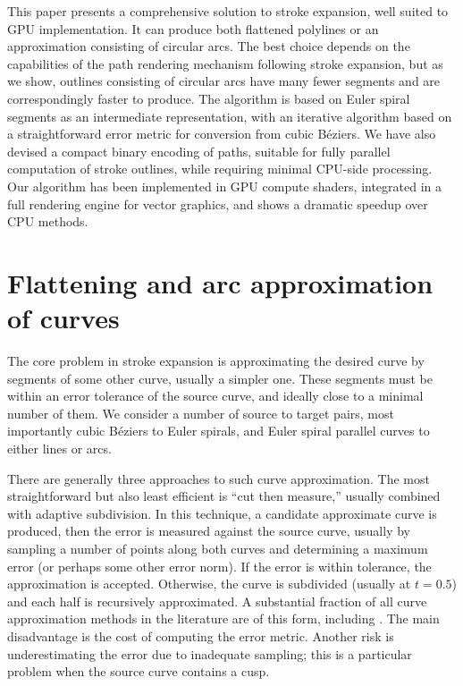 \documentclass[sigconf]{acmart}
\begin{document}
This paper presents a comprehensive solution to stroke expansion, well suited to GPU implementation. It can produce both flattened polylines or an approximation consisting of circular arcs. The best choice depends on the capabilities of the path rendering mechanism following stroke expansion, but as we show, outlines consisting of circular arcs have many fewer segments and are correspondingly faster to produce. The algorithm is based on Euler spiral segments as an intermediate representation, with an iterative algorithm based on a straightforward error metric for conversion from cubic Béziers. We have also devised a compact binary encoding of paths, suitable for fully parallel computation of stroke outlines, while requiring minimal CPU-side processing. Our algorithm has been implemented in GPU compute shaders, integrated in a full rendering engine for vector graphics, and shows a dramatic speedup over CPU methods.

\section{Flattening and arc approximation of curves}


The core problem in stroke expansion is approximating the desired curve by segments of some other curve, usually a simpler one. These segments must be within an error tolerance of the source curve, and ideally close to a minimal number of them. We consider a number of source to target pairs, most importantly cubic Béziers to Euler spirals, and Euler spiral parallel curves to either lines or arcs.

There are generally three approaches to such curve approximation. The most straightforward but also least efficient is ``cut then measure,'' usually combined with adaptive subdivision. In this technique, a candidate approximate curve is produced, then the error is measured against the source curve, usually by sampling a number of points along both curves and determining a maximum error (or perhaps some other error norm). If the error is within tolerance, the approximation is accepted. Otherwise, the curve is subdivided (usually at $t = 0.5$) and each half is recursively approximated. A substantial fraction of all curve approximation methods in the literature are of this form, including \citet{Nehab2020}. The main disadvantage is the cost of computing the error metric. Another risk is underestimating the error due to inadequate sampling; this is a particular problem when the source curve contains a cusp.
\end{document}
